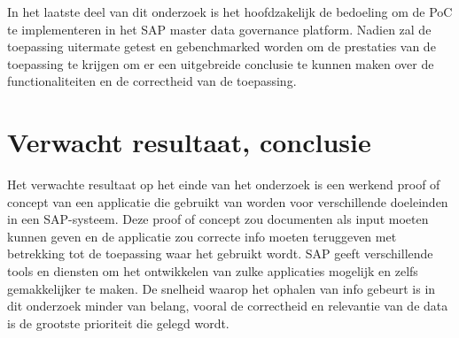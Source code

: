 In het laatste deel van dit onderzoek is het hoofdzakelijk de bedoeling om de PoC te implementeren in het SAP master data governance platform. Nadien zal de toepassing uitermate getest en gebenchmarked worden om de prestaties van de toepassing te krijgen om er een uitgebreide conclusie te kunnen maken over de functionaliteiten en de correctheid van de toepassing.

\section{Verwacht resultaat, conclusie}%
\label{sec:verwachte_resultaten}

%
%

Het verwachte resultaat op het einde van het onderzoek is een werkend proof of concept van een applicatie die gebruikt van worden voor verschillende doeleinden in een SAP-systeem. Deze proof of concept zou documenten als input moeten kunnen geven en de applicatie zou correcte info moeten teruggeven met betrekking tot de toepassing waar het gebruikt wordt. SAP geeft verschillende tools en diensten om het ontwikkelen van zulke applicaties mogelijk en zelfs gemakkelijker te maken. De snelheid waarop het ophalen van info gebeurt is in dit onderzoek minder van belang, vooral de correctheid en relevantie van de data is de grootste prioriteit die gelegd wordt.
